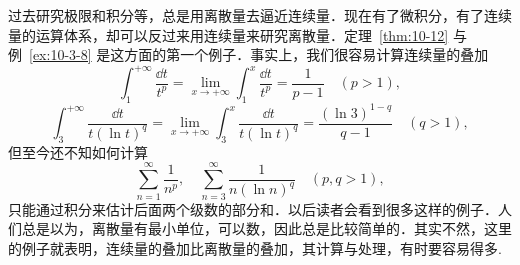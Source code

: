 过去研究极限和积分等，总是用离散量去逼近连续量．现在有了微积分，有了连续量的运算体系，却可以反过来用连续量来研究离散量．定理~\ref{thm:10-12} 与例~\ref{ex:10-3-8} 是这方面的第一个例子．事实上，我们很容易计算连续量的叠加
\[
\int_{1}^{+\infty}\frac{\dd t}{t^{p}}=\lim_{x\to+\infty}\int_{1}^{x}\frac{\dd t}{t^{p}}=\frac{1}{p-1}\quad(p>1),
\]
\[
\int_{3}^{+\infty}\frac{\dd t}{t(\ln t)^{q}}=\lim_{x\rightarrow+\infty}\int_{3}^{x}\frac{\dd t}{t(\ln t)^{q}}=\frac{(\ln 3)^{1-q}}{q-1}\quad(q>1),
\]
但至今还不知如何计算
\[
\sum_{n=1}^{\infty}\frac{1}{n^{p}},\quad\sum_{n=3}^{\infty}\frac{1}{n(\ln n)^{q}}\quad(p,q>1),
\]
只能通过积分来估计后面两个级数的部分和．以后读者会看到很多这样的例子．人们总是以为，离散量有最小单位，可以数，因此总是比较简单的．其实不然，这里的例子就表明，连续量的叠加比离散量的叠加，其计算与处理，有时要容易得多.

